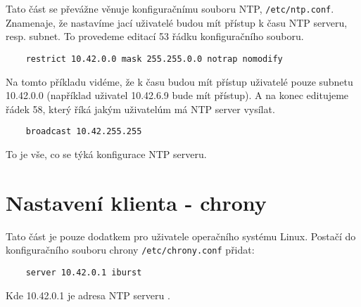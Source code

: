     Tato část se převážne věnuje konfiguračnímu souboru NTP, \verb|/etc/ntp.conf|.
    Znamenaje, že nastavíme jací uživatelé budou mít přístup k času NTP serveru, resp.
    subnet. To provedeme editací 53 řádku konfiguračního souboru.

    \begin{lstlisting}
    restrict 10.42.0.0 mask 255.255.0.0 notrap nomodify
    \end{lstlisting}

    Na tomto příkladu vidéme, že k času budou mít přístup uživatelé pouze subnetu
    10.42.0.0 (například uživatel 10.42.6.9 bude mít přístup). A na konec editujeme řádek
    58, který říká jakým uživatelúm má NTP server vysílat.

    \begin{lstlisting}
    broadcast 10.42.255.255
    \end{lstlisting}

    \noindent To je vše, co se týká konfigurace NTP serveru.

\section{Nastavení klienta - chrony}

    Tato část je pouze dodatkem pro uživatele operačního systému Linux. Postačí do
    konfiguračního souboru chrony \verb|/etc/chrony.conf| přidat:

    \begin{lstlisting}
    server 10.42.0.1 iburst
    \end{lstlisting}

    \noindent Kde 10.42.0.1 je adresa NTP serveru \cite{chrony}.
